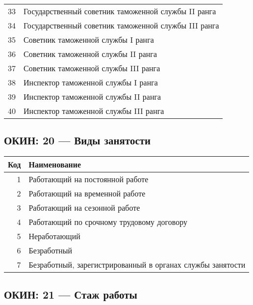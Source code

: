 \documentclass[10pt, a4paper, titlepage]{article}
\begin{document}
\begin{center}
\begin{longtable}{rp{}}
        33 & Государственный советник таможенной службы II ранга \\
        34 & Государственный советник таможенной службы III ранга \\
        35 & Советник таможенной службы I ранга \\
        36 & Советник таможенной службы II ранга \\
        37 & Советник таможенной службы III ранга \\
        38 & Инспектор таможенной службы I ранга \\
        39 & Инспектор таможенной службы II ранга \\
        40 & Инспектор таможенной службы III ранга \\
    \end{longtable}
\end{center}

\subsection{ОКИН: 20 --- Виды занятости}

\begin{center}
    \begin{tabular}{rp{}}
        \hline
        \textbf{Код} & \textbf{Наименование} \\ \hline
        1 & Работающий на постоянной работе \\
        2 & Работающий на временной работе \\
        3 & Работающий на сезонной работе \\
        4 & Работающий по срочному трудовому договору \\
        5 & Неработающий \\
        6 & Безработный \\
        7 & Безработный, зарегистрированный в органах службы занятости \\
    \end{tabular}
\end{center}

\subsection{ОКИН: 21 --- Стаж работы}
\end{document}
